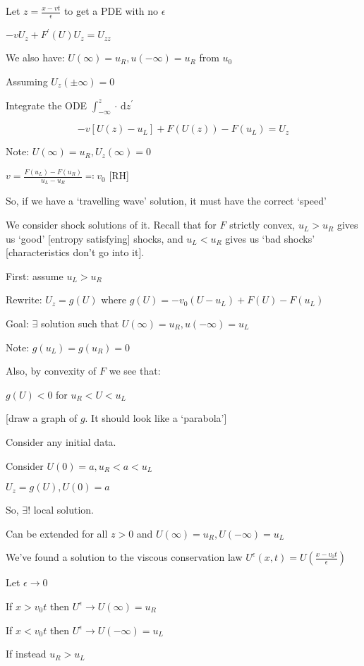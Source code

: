 \documentclass{article}
\theoremstyle{definition}
\begin{document}
Let \(z = \frac{x-vt}{\epsilon}\) to get a PDE with no \(\epsilon\)  

\(- v U_z + F^{\prime} (U) U_z = U_{z z}\) 

We also have: \(U(\infty)=u_R, u(-\infty)=u_R\) from \(u_0\) 

Assuming \(U_z(\pm \infty)=0\)

Integrate the ODE \(\int_{-\infty}^{z} \cdot \,\mathrm{d}z^{\prime} \) 

\[
    - v [U(z)-u_L] + F(U(z)) - F(u_L) = U_z
\]

Note: \(U(\infty)=u_R, U_z(\infty)=0\) 

\(v = \frac{F(u_L)-F(u_R)}{u_L - u_R} \eqqcolon v_0\) [RH]

So, if we have a `travelling wave' solution, it must have the correct `speed'

We consider shock solutions of it. Recall that for \(F\) strictly convex, \(u_L > u_R\) gives us `good' [entropy satisfying] shocks, and \(u_L < u_R\) gives us `bad shocks' [characteristics don't go into it].

First: assume \(u_L > u_R\) 

Rewrite: \(U_z = g(U)\) where \(g(U)= - v_0 (U-u_L) + F(U) - F(u_L)\) 

Goal: \(\exists\) solution such that \(U(\infty)=u_R, u(-\infty)=u_L\)  

Note: \(g(u_L)=g(u_R)=0\) 

Also, by convexity of \(F\) we see that:

\(g(U) < 0\) for \(u_R < U < u_L\)

[draw a graph of \(g\). It should look like a `parabola']

Consider any initial data.

Consider \(U(0)=a, u_R < a < u_L\) 

\(U_z = g(U), U(0)=a\) 

So, \(\exists !\) local solution.

Can be extended for all \(z>0\) and \(U(\infty)=u_R, U(-\infty)=u_L\)

We've found a solution to the viscous conservation law \(U^{\epsilon}(x,t)=U\left( \frac{x-v_0t}{\epsilon}\right)  \) 

Let \(\epsilon \to 0\)

If \(x > v_0 t\) then \(U^{\epsilon} \to U(\infty)=u_R\) 

If \(x < v_0 t\) then \(U^{\epsilon} \to U(-\infty) = u_L\) 

If instead \(u_R > u_L\)
\end{document}
